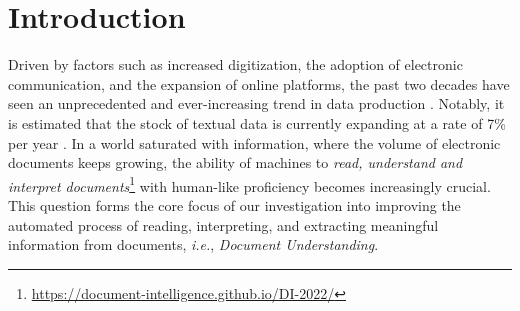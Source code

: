 \chapter{Introduction}
\label{chapter:introduction}

{}



Driven by factors such as increased digitization, the adoption of electronic communication, and the expansion of online platforms, the past two decades have seen an unprecedented and ever-increasing trend in data production \citep{hilbert2011world, clissa2022survey}. Notably, it is estimated that the stock of textual data is currently expanding at a rate of 7\% per year \citep{villalobos2022will}. In a world saturated with information, where the volume of electronic documents keeps growing, the ability of machines to \textit{read, understand and interpret documents}\footnote{\url{https://document-intelligence.github.io/DI-2022/}} with human-like proficiency becomes increasingly crucial. This question forms the core focus of our investigation into improving the automated process of reading, interpreting, and extracting meaningful information from documents, \textit{i.e.}, \emph{Document Understanding}.


